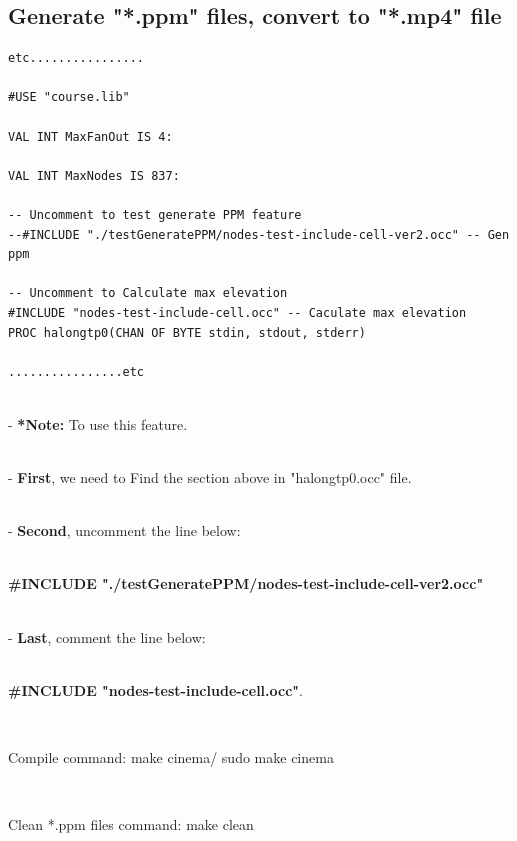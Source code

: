 \documentclass{article}
\begin{document}
\newpage
\raggedright
\subsection{Generate "*.ppm" files, convert to "*.mp4" file}
\begin{tcolorbox}
\begin{lstlisting}
etc................

#USE "course.lib"

VAL INT MaxFanOut IS 4:

VAL INT MaxNodes IS 837:

-- Uncomment to test generate PPM feature
--#INCLUDE "./testGeneratePPM/nodes-test-include-cell-ver2.occ" -- Gen ppm

-- Uncomment to Calculate max elevation
#INCLUDE "nodes-test-include-cell.occ" -- Caculate max elevation
PROC halongtp0(CHAN OF BYTE stdin, stdout, stderr)

................etc
\end{lstlisting}
\end{tcolorbox}
\\[1\baselineskip]

- \textbf{*Note:} To use this feature. 

\\[1\baselineskip]

- \textbf{First}, we need to Find the section above in "halongtp0.occ" file. 

\\[1\baselineskip]

- \textbf{Second}, uncomment the line below:

\\[1\baselineskip]

\textbf{#INCLUDE "./testGeneratePPM/nodes-test-include-cell-ver2.occ"}
 
\\[1\baselineskip]

- \textbf{Last}, comment the line below: 

\\[1\baselineskip]

\textbf{#INCLUDE "nodes-test-include-cell.occ"}.

\\[1\baselineskip]
\begin{tcolorbox}
Compile command: make cinema/ sudo make cinema 
\end{tcolorbox}
\\[1\baselineskip]
\begin{tcolorbox}
Clean *.ppm files command: make clean
\end{tcolorbox}
\end{document}
